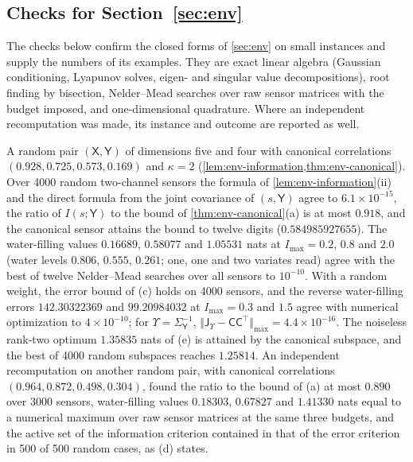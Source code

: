 \subsection{Checks for \texorpdfstring{Section~\ref{sec:env}}{abstract environments}}\label{chk:env}

The checks below confirm the closed forms of \cref{sec:env} on small instances and supply the numbers of its examples. They are exact linear algebra (Gaussian conditioning, Lyapunov solves, eigen- and singular value decompositions), root finding by bisection, Nelder--Mead searches over raw sensor matrices with the budget imposed, and one-dimensional quadrature. Where an independent recomputation was made, its instance and outcome are reported as well.

\begin{numcheck}\label{chk:env-sensors}
A random pair $(\mathsf X,\mathsf Y)$ of dimensions five and four with canonical correlations $(0.928,0.725,0.573,0.169)$ and $\kappa=2$ (\cref{lem:env-information,thm:env-canonical}). Over 4000 random two-channel sensors the formula of \cref{lem:env-information}(ii) and the direct formula from the joint covariance of $(s,\mathsf Y)$ agree to $6.1\times10^{-15}$, the ratio of $I(s;\mathsf Y)$ to the bound of \cref{thm:env-canonical}(a) is at most $0.918$, and the canonical sensor attains the bound to twelve digits ($0.584985927655$). The water-filling values $0.16689$, $0.58077$ and $1.05531$ nats at $I_{\max}=0.2$, $0.8$ and $2.0$ (water levels $0.806$, $0.555$, $0.261$; one, one and two variates read) agree with the best of twelve Nelder--Mead searches over all sensors to $10^{-10}$. With a random weight, the error bound of (c) holds on 4000 sensors, and the reverse water-filling errors $142.30322369$ and $99.20984032$ at $I_{\max}=0.3$ and $1.5$ agree with numerical optimization to $4\times10^{-10}$; for $\Upsilon=\Sigma_{\mathsf Y}^{-1}$, $\Vert\mathsf J_\Upsilon-\mathsf C\mathsf C^\top\Vert_{\max}=4.4\times10^{-16}$. The noiseless rank-two optimum $1.35835$ nats of (e) is attained by the canonical subspace, and the best of 4000 random subspaces reaches $1.25814$. An independent recomputation on another random pair, with canonical correlations $(0.964,0.872,0.498,0.304)$, found the ratio to the bound of (a) at most $0.890$ over 3000 sensors, water-filling values $0.18303$, $0.67827$ and $1.41330$ nats equal to a numerical maximum over raw sensor matrices at the same three budgets, and the active set of the information criterion contained in that of the error criterion in 500 of 500 random cases, as (d) states.
\end{numcheck}

